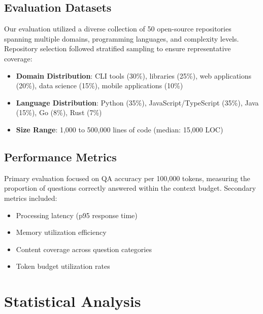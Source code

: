 \documentclass[conference]{IEEEtran}
\begin{document}
\subsection{Evaluation Datasets}
\label{subsec:datasets}

Our evaluation utilized a diverse collection of 50 open-source repositories spanning multiple domains, programming languages, and complexity levels. Repository selection followed stratified sampling to ensure representative coverage:

\begin{itemize}
    \item \textbf{Domain Distribution}: CLI tools (30\%), libraries (25\%), web applications (20\%), data science (15\%), mobile applications (10\%)
    \item \textbf{Language Distribution}: Python (35\%), JavaScript/TypeScript (35\%), Java (15\%), Go (8\%), Rust (7\%)
    \item \textbf{Size Range}: 1,000 to 500,000 lines of code (median: 15,000 LOC)
\end{itemize}

\subsection{Performance Metrics}
\label{subsec:metrics}

Primary evaluation focused on QA accuracy per 100,000 tokens, measuring the proportion of questions correctly answered within the context budget. Secondary metrics included:

\begin{itemize}
    \item Processing latency (p95 response time)
    \item Memory utilization efficiency  
    \item Content coverage across question categories
    \item Token budget utilization rates
\end{itemize}


\section{Statistical Analysis}
\label{sec:statistical_analysis}
\end{document}
